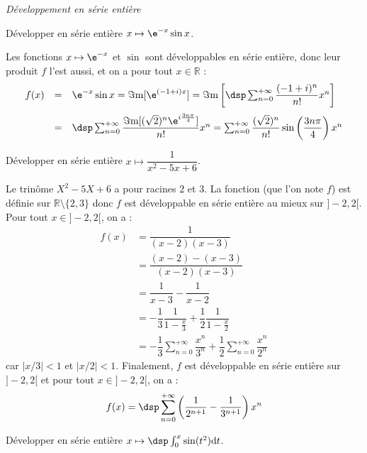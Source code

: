 \documentclass[a4paper,10pt]{report}
\begin{document}
\medskip

\begin{center}
\textit{{ {\large Développement en série entière}}}
\end{center}

\medskip

\begin{Exercice}{} Développer en série entière $x \mapsto \e^{-x}\sin x$.
\end{Exercice}

\corr Les fonctions $x\mapsto\e^{-x}$ et $\sin$ sont développables en série entière, donc leur produit $f$ l'est aussi, et on a pour tout $x\in\mathbb{R}$ : 
\[
\begin{array}{rcl}
f(x) &= & \e^{-x}\sin x=\Im\mathrm{m}[\e^{(-1+i)x}]=\Im\mathrm{m}\left[\dsp\sum_{n=0}^{+\infty}\dfrac{(-1+i)^n}{n!}x^n\right]\\
\vspace*{-0.2cm}\\
& = & \dsp\sum_{n=0}^{+\infty}\dfrac{\Im\mathrm{m}[(\sqrt{2})^n\e^{i\frac{3n\pi}{4}}]}{n!}x^n=\sum_{n=0}^{+\infty}\dfrac{(\sqrt{2})^n}{n!}\sin\left(\dfrac{3n\pi}{4}\right)x^n
\end{array}
\]

\begin{Exercice}{} Développer en série entière $x \mapsto \dfrac{1}{x^2-5x+6}$.
\end{Exercice}

\corr Le trinôme $X^2-5X+6$ a pour racines $2$ et $3$. La fonction (que l'on note $f$) est définie sur $\mathbb{R} \setminus \lbrace 2,3 \rbrace$ donc $f$ est développable en série entière au mieux sur $]-2,2[$. Pour tout $x \in ]-2,2[$, on a :
\begin{align*}
f(x) & = \dfrac{1}{(x-2)(x-3)}\\
&  = \dfrac{(x-2)-(x-3)}{(x-2)(x-3)}  \\
& = \dfrac{1}{x-3} - \dfrac{1}{x-2} \\
& = -\dfrac{1}{3}\dfrac{1}{1-\frac{x}{3}}+\dfrac{1}{2}\dfrac{1}{1-\frac{x}{2}} \\
& =-\dfrac{1}{3}\sum_{n=0}^{+\infty}\dfrac{x^n}{3^n}+\dfrac{1}{2}\sum_{n=0}^{+\infty}\dfrac{x^n}{2^n}
\end{align*} 
car $\vert x/3 \vert <1$ et $\vert x/2 \vert <1$. Finalement, $f$ est développable en série entière sur $]-2,2[$ et pour tout $x \in ]-2,2[$, on a :
$$ f(x) = \dsp\sum_{n=0}^{+\infty}\left(  \dfrac{1}{2^{n+1}}-\dfrac{1}{3^{n+1}}\right)x^n$$

\begin{Exercice}{} Développer en série entière $x \mapsto \dsp\int_0^x\sin(t^2)\mathrm{d}t$.
\end{Exercice}
\end{document}
